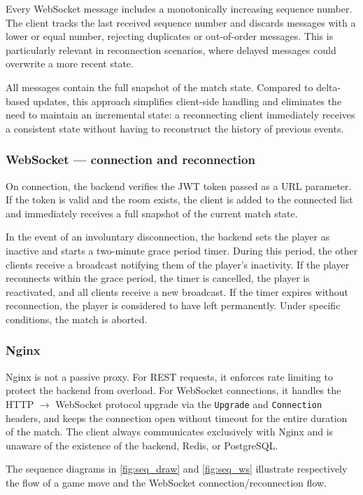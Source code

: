 \documentclass{scrartcl}
\begin{document}
Every WebSocket message includes a monotonically increasing sequence number.
The client tracks the last received sequence number and discards messages
with a lower or equal number, rejecting duplicates or out-of-order messages.
This is particularly relevant in reconnection scenarios, where delayed messages
could overwrite a more recent state.

All messages contain the full snapshot of the match state.
Compared to delta-based updates, this approach simplifies client-side handling
and eliminates the need to maintain an incremental state:
a reconnecting client immediately receives a consistent state without having
to reconstruct the history of previous events.

\subsubsection*{WebSocket --- connection and reconnection}

On connection, the backend verifies the JWT token passed as a URL parameter.
If the token is valid and the room exists, the client is added to the
connected list and immediately receives a full snapshot of the current match state.

In the event of an involuntary disconnection, the backend sets the player
as inactive and starts a two-minute grace period timer.
During this period, the other clients receive a broadcast notifying them
of the player's inactivity.
If the player reconnects within the grace period, the timer is cancelled,
the player is reactivated, and all clients receive a new broadcast.
If the timer expires without reconnection, the player is considered to have
left permanently. Under specific conditions, the match is aborted.

\subsubsection*{Nginx}

Nginx is not a passive proxy.
For REST requests, it enforces rate limiting to protect the backend from overload.
For WebSocket connections, it handles the HTTP $\rightarrow$ WebSocket protocol
upgrade via the \texttt{Upgrade} and \texttt{Connection} headers,
and keeps the connection open without timeout for the entire duration of the match.
The client always communicates exclusively with Nginx and is unaware of the
existence of the backend, Redis, or PostgreSQL.

The sequence diagrams in \cref{fig:seq_draw} and \cref{fig:seq_ws} illustrate
respectively the flow of a game move and the WebSocket connection/reconnection flow.
\end{document}
